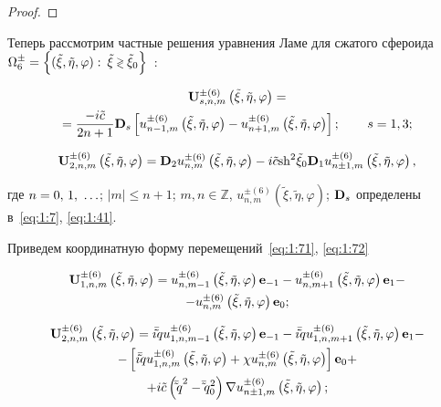 \begin{russian}
\begin{proof}
\end{proof}

Теперь рассмотрим частные решения уравнения Ламе для сжатого сфероида $\Omega _6^ \pm = \Big\{ {(\tilde \xi ,\tilde \eta ,\varphi ):{\mkern 1mu} {\mkern 1mu} {\kern 1pt} \tilde \xi  \mathbin{\lower.3ex\hbox{$\buildrel>\over
{\smash{\scriptstyle<}\vphantom{_x}}$}} {{\tilde \xi }_0}} \Big\}$~\cite{Nikolaev1993}:

\begin{multline}\label{eq:1:71}
{\bf{U}}_{s,n,m}^{ \pm (6)}\left( {\tilde \xi ,\tilde \eta ,\varphi } \right) = \\
= \frac{{ - i\tilde c}}{{2n + 1}}{{\bf{D}}_s}\left[ {u_{n - 1,m}^{ \pm (6)}\left( {\tilde \xi ,\tilde \eta ,\varphi } \right) - u_{n + 1,m}^{ \pm (6)}\left( {\tilde \xi ,\tilde \eta ,\varphi } \right)} \right];\qquad {\kern 1pt} s = 1,3;
\end{multline}

\begin{equation}\label{eq:1:72}
{\bf{U}}_{2,n,m}^{ \pm (6)}\left( {\tilde \xi ,\tilde \eta ,\varphi } \right) = {{\bf{D}}_2}u_{n,m}^{ \pm (6)}\left( {\tilde \xi ,\tilde \eta ,\varphi } \right) - i\tilde c{{\mathop{\rm sh}\nolimits} ^2}{\tilde \xi _0}{{\bf{D}}_1}u_{n \pm 1,m}^{ \pm (6)}\left( {\tilde \xi ,\tilde \eta ,\varphi } \right),
\end{equation}

\noindent где $n = 0,{\mkern 1mu} {\kern 1pt} 1,{\mkern 1mu} {\kern 1pt}  \ldots $; $|m| \le n + 1$; $m,n\in\mathbb{Z}$, $u_{n,m}^{ \pm (6)}\left( {\tilde \xi ,\tilde \eta ,\varphi } \right)$; ${{\bf{D}}_s}$ определены в~\eqref{eq:1:7}, \eqref{eq:1:41}.

Приведем координатную форму перемещений~\eqref{eq:1:71}, \eqref{eq:1:72}

\begin{multline}\label{eq:1:73}
{\bf{U}}_{1,n,m}^{ \pm (6)}\left( {\tilde \xi ,\tilde \eta ,\varphi } \right) = u_{n,m - 1}^{ \pm (6)}\left( {\tilde \xi ,\tilde \eta ,\varphi } \right){{\bf{e}}_{ - 1}} - u_{n,m + 1}^{ \pm (6)}\left( {\tilde \xi ,\tilde \eta ,\varphi } \right){{\bf{e}}_1} - \\
- u_{n,m}^{ \pm (6)}\left( {\tilde \xi ,\tilde \eta ,\varphi } \right){{\bf{e}}_0};
\end{multline}

\begin{multline}\label{eq:1:74}
{\bf{U}}_{2,n,m}^{ \pm (6)}\left( {\tilde \xi ,\tilde \eta ,\varphi } \right) = i\bar \tilde qu_{1,n,m - 1}^{ \pm (6)}\left( {\tilde \xi ,\tilde \eta ,\varphi } \right){{\bf{e}}_{ - 1}} - i\bar \tilde qu_{1,n,m + 1}^{ \pm (6)}\left( {\tilde \xi ,\tilde \eta ,\varphi } \right){{\bf{e}}_1} - \\
- \left[ {i\bar \tilde qu_{1,n,m}^{ \pm (6)}\left( {\tilde \xi ,\tilde \eta ,\varphi } \right) + \chi u_{n,m}^{ \pm (6)}\left( {\tilde \xi ,\tilde \eta ,\varphi } \right)} \right]{{\bf{e}}_0} + \\
+ i\tilde c\left( {{{\bar \tilde q}^2} - \bar \tilde q_0^2} \right)\nabla u_{n \pm 1,m}^{ \pm (6)}\left( {\tilde \xi ,\tilde \eta ,\varphi } \right);
\end{multline}


\end{russian}
